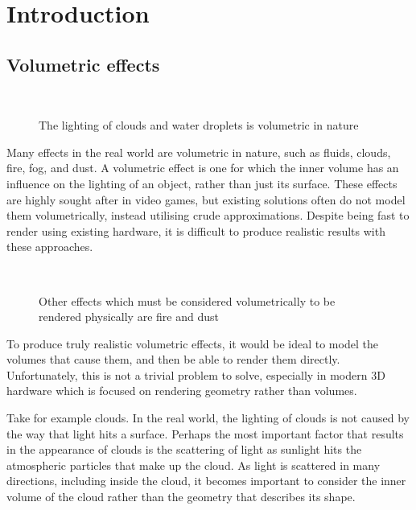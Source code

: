 \chapter{Introduction}
\label{intro}

\section{Volumetric effects}

\begin{figure}
	\centering
	~

	\caption{The lighting of clouds and water droplets is volumetric in nature}
	\label{fig:volumetric-effects}
\end{figure}

Many effects in the real world are volumetric in nature, such as fluids, clouds, fire, fog, and dust. A volumetric effect is one for which the inner volume has an influence on the lighting of an object, rather than just its surface. These effects are highly sought after in video games, but existing solutions often do not model them volumetrically, instead utilising crude approximations. Despite being fast to render using existing hardware, it is difficult to produce realistic results with these approaches.

\begin{figure}
\centering
	~

	\caption{Other effects which must be considered volumetrically to be rendered physically are fire and dust}
	\label{fig:fire_dust-effects}
\end{figure}

To produce truly realistic volumetric effects, it would be ideal to model the volumes that cause them, and then be able to render them directly. Unfortunately, this is not a trivial problem to solve, especially in modern 3D hardware which is focused on rendering geometry rather than volumes.

Take for example clouds. In the real world, the lighting of clouds is not caused by the way that light hits a surface. Perhaps the most important factor that results in the appearance of clouds is the scattering of light as sunlight hits the atmospheric particles that make up the cloud. As light is scattered in many directions, including inside the cloud, it becomes important to consider the inner volume of the cloud rather than the geometry that describes its shape.

